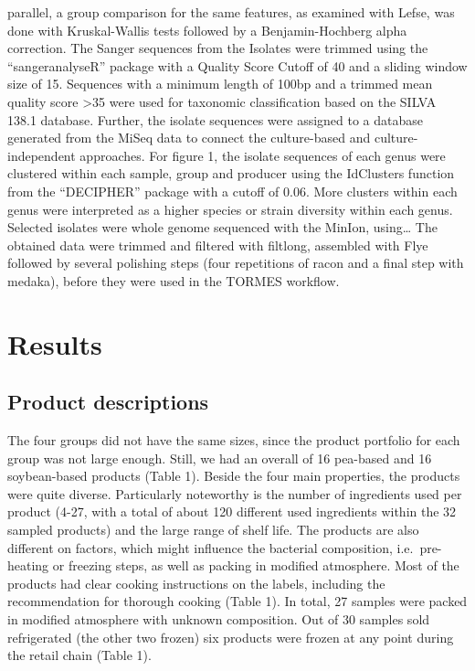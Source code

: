 \documentclass[preprint, 3p,
authoryear]{elsarticle} %
\begin{document}
parallel, a group comparison for the same features, as examined with
Lefse, was done with Kruskal-Wallis tests followed by a
Benjamin-Hochberg alpha correction. The Sanger sequences from the
Isolates were trimmed using the ``sangeranalyseR'' package with a
Quality Score Cutoff of 40 and a sliding window size of 15. Sequences
with a minimum length of 100bp and a trimmed mean quality score
\textgreater35 were used for taxonomic classification based on the SILVA
138.1 database. Further, the isolate sequences were assigned to a
database generated from the MiSeq data to connect the culture-based and
culture-independent approaches. For figure 1, the isolate sequences of
each genus were clustered within each sample, group and producer using
the IdClusters function from the ``DECIPHER'' package with a cutoff of
0.06. More clusters within each genus were interpreted as a higher
species or strain diversity within each genus. Selected isolates were
whole genome sequenced with the MinIon, using\ldots{} The obtained data
were trimmed and filtered with filtlong, assembled with Flye followed by
several polishing steps (four repetitions of racon and a final step with
medaka), before they were used in the TORMES workflow.

\hypertarget{results}{%
\section{Results}\label{results}}

\hypertarget{product-descriptions}{%
\subsection{Product descriptions}\label{product-descriptions}}

The four groups did not have the same sizes, since the product portfolio
for each group was not large enough. Still, we had an overall of 16
pea-based and 16 soybean-based products (Table 1). Beside the four main
properties, the products were quite diverse. Particularly noteworthy is
the number of ingredients used per product (4-27, with a total of about
120 different used ingredients within the 32 sampled products) and the
large range of shelf life. The products are also different on factors,
which might influence the bacterial composition, i.e.~pre-heating or
freezing steps, as well as packing in modified atmosphere. Most of the
products had clear cooking instructions on the labels, including the
recommendation for thorough cooking (Table 1). In total, 27 samples were
packed in modified atmosphere with unknown composition. Out of 30
samples sold refrigerated (the other two frozen) six products were
frozen at any point during the retail chain (Table 1).
\end{document}
